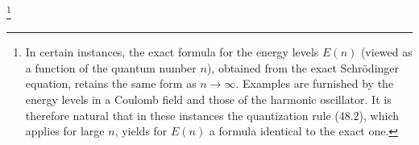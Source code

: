 \footnote{In certain instances, the exact formula for the energy levels
$E(n)$ (viewed as a function of the quantum number $n$), obtained from the
exact Schrödinger equation, retains the same form as $n\to\infty$.  Examples
are furnished by the energy levels in a Coulomb field and those of the
harmonic oscillator.  It is therefore natural that in these instances the
quantization rule (48.2), which applies for large $n$, yields for $E(n)$ a
formula identical to the exact one.}
